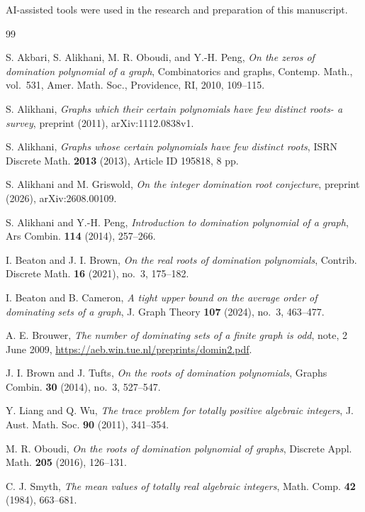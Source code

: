 \documentclass{amsart}
\theoremstyle{definition}
\theoremstyle{remark}
\numberwithin{equation}{section}
\begin{document}
AI-assisted tools were used in the research and preparation of this manuscript.

\begin{thebibliography}{99}

S. Akbari, S. Alikhani, M. R. Oboudi, and Y.-H. Peng, \emph{On the zeros of domination polynomial of a graph}, Combinatorics and graphs, Contemp. Math., vol.~531, Amer. Math. Soc., Providence, RI, 2010, 109--115.

S. Alikhani, \emph{Graphs which their certain polynomials have few distinct roots- a survey}, preprint (2011), arXiv:1112.0838v1.

S. Alikhani, \emph{Graphs whose certain polynomials have few distinct roots}, ISRN Discrete Math. \textbf{2013} (2013), Article ID 195818, 8 pp.

S. Alikhani and M. Griswold, \emph{On the integer domination root conjecture}, preprint (2026), arXiv:2608.00109.

S. Alikhani and Y.-H. Peng, \emph{Introduction to domination polynomial of a graph}, Ars Combin. \textbf{114} (2014), 257--266.

I. Beaton and J. I. Brown, \emph{On the real roots of domination polynomials}, Contrib. Discrete Math. \textbf{16} (2021), no.~3, 175--182.

I. Beaton and B. Cameron, \emph{A tight upper bound on the average order of dominating sets of a graph}, J. Graph Theory \textbf{107} (2024), no.~3, 463--477.

A. E. Brouwer, \emph{The number of dominating sets of a finite graph is odd}, note, 2 June 2009, \url{https://aeb.win.tue.nl/preprints/domin2.pdf}.

J. I. Brown and J. Tufts, \emph{On the roots of domination polynomials}, Graphs Combin. \textbf{30} (2014), no.~3, 527--547.

Y. Liang and Q. Wu, \emph{The trace problem for totally positive algebraic integers}, J. Aust. Math. Soc. \textbf{90} (2011), 341--354.

M. R. Oboudi, \emph{On the roots of domination polynomial of graphs}, Discrete Appl. Math. \textbf{205} (2016), 126--131.

C. J. Smyth, \emph{The mean values of totally real algebraic integers}, Math. Comp. \textbf{42} (1984), 663--681.

\end{thebibliography}
\end{document}
